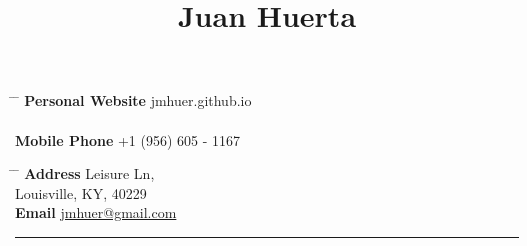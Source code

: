 \documentclass[10pt]{article} %
\begin{document}
\pagestyle{fancy}

\title{Juan Huerta } %


\parbox{0.5\textwidth}{ %
\begin{tabbing} %
\hspace{3cm} \= \hspace{4cm} \= \kill %
{\bf Personal Website} \>  jmhuer.github.io \\ %
\\
{\bf Mobile Phone} \> +1 (956) 605 - 1167 \\ %

\end{tabbing}}
\hfill %
\parbox{0.5\textwidth}{ %
\begin{tabbing} %
\hspace{3cm} \= \hspace{4cm} \= \kill %
{\bf Address}  Leisure Ln,\\ %
\> Louisville, KY, 40229 \\ %
{\bf Email} \> \href{mailto:jmhuer@gmail.com}{jmhuer@gmail.com} \\ %
\end{tabbing}}



\noindent\rule{1cm}{0.4pt}
\end{document}
